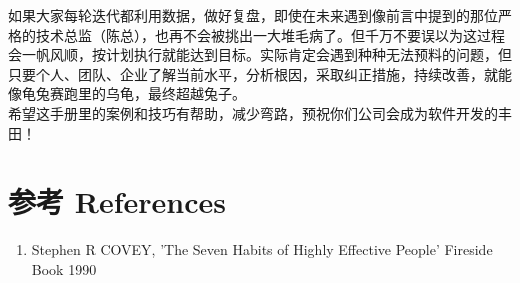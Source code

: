 如果大家每轮迭代都利用数据，做好复盘，即使在未来遇到像前言中提到的那位严格的技术总监（陈总），也再不会被挑出一大堆毛病了。但千万不要误以为这过程会一帆风顺，按计划执行就能达到目标。实际肯定会遇到种种无法预料的问题，但只要个人、团队、企业了解当前水平，分析根因，采取纠正措施，持续改善，就能像龟兔赛跑里的乌龟，最终超越兔子。\\
希望这手册里的案例和技巧有帮助，减少弯路，预祝你们公司会成为软件开发的丰田！


\hypertarget{ux53c2ux8003-references}{%
\section{参考 References}\label{ux53c2ux8003-references}}

\begin{enumerate}
\tightlist
\item
  Stephen R COVEY, 'The Seven Habits of Highly Effective People' Fireside Book 1990
\end{enumerate}

